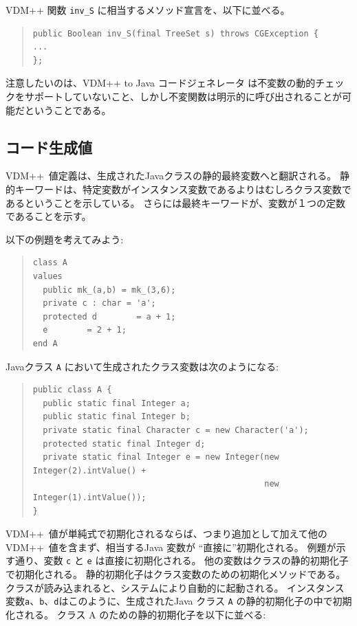 \documentclass[\pformat,11pt]{jarticle}
\newcommand{\VDM}{VDM++}
\newcommand{\cg}{VDM++ to Java コードジェネレータ}
\begin{document}
\VDM{} 関数 {\tt inv\_S} に相当するメソッド宣言を、以下に並べる。

\begin{quote}
\begin{verbatim}
public Boolean inv_S(final TreeSet s) throws CGException {
...
};
\end{verbatim}
\end{quote}

注意したいのは、\cg{} は不変数の動的チェックをサポートしていないこと、しかし不変関数は明示的に呼び出されることが可能だということである。

\subsection{コード生成値}
\label{values}

\VDM\ 値定義は、生成されたJavaクラスの静的最終変数へと翻訳される。
静的キーワードは、特定変数がインスタンス変数であるよりはむしろクラス変数であるということを示している。
さらには最終キーワードが、変数が１つの定数であることを示す。

以下の例題を考えてみよう:

\begin{quote}
\begin{verbatim}
class A
values
  public mk_(a,b) = mk_(3,6);
  private c : char = 'a';
  protected d        = a + 1;
  e        = 2 + 1;
end A
\end{verbatim}
\end{quote}

Javaクラス {\tt A} において生成されたクラス変数は次のようになる:

\begin{quote}
\begin{small}
\begin{verbatim}
public class A {
  public static final Integer a;
  public static final Integer b;
  private static final Character c = new Character('a');
  protected static final Integer d;
  private static final Integer e = new Integer(new Integer(2).intValue() +
                                               new Integer(1).intValue());
}
\end{verbatim}
\end{small}
\end{quote}

 \VDM\ 値が単純式で初期化されるならば、つまり追加として加えて他の \VDM\ 値を含まず、相当するJava 変数が ``直接に''初期化される。
例題が示す通り、変数 {\tt c} と {\tt e} は直接に初期化される。
他の変数はクラスの静的初期化子で初期化される。
静的初期化子はクラス変数のための初期化メソッドである。
クラスが読み込まれると、システムにより自動的に起動される。
インスタンス変数{\tt a}、{\tt b}、{\tt d}はこのように、生成されたJava クラス {\tt A} の静的初期化子の中で初期化される。
クラス A のための静的初期化子を以下に並べる:
\end{document}
